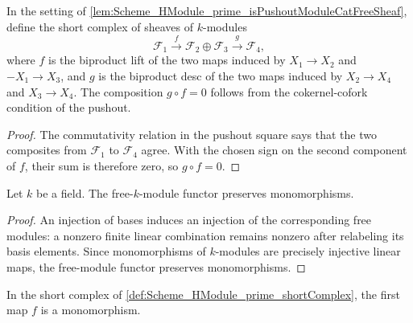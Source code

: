 \begin{definition}\leanok
  \label{def:Scheme_HModule_prime_shortComplex}

  In the setting of \cref{lem:Scheme_HModule_prime_isPushoutModuleCatFreeSheaf}, define the short complex of sheaves of \(k\)-modules
  \[
    \mathcal F_1 \xrightarrow{\;f\;} \mathcal F_2 \oplus \mathcal F_3 \xrightarrow{\;g\;} \mathcal F_4,
  \]
  where \(f\) is the biproduct lift of the two maps induced by \(X_1 \to X_2\) and \(-X_1 \to X_3\), and \(g\) is the biproduct desc of the two maps induced by \(X_2 \to X_4\) and \(X_3 \to X_4\). The composition \(g \circ f = 0\) follows from the cokernel-cofork condition of the pushout.
\end{definition}

\begin{proof}
  
  \leanok
  The commutativity relation in the pushout square says that the two composites from \(\mathcal F_1\) to \(\mathcal F_4\) agree. With the chosen sign on the second component of \(f\), their sum is therefore zero, so \(g\circ f=0\).
\end{proof}

\begin{definition}\leanok
  \label{def:Scheme_ModuleCat_free_preservesMonomorphisms}
  Let \(k\) be a field. The free-\(k\)-module functor preserves monomorphisms.
\end{definition}

\begin{proof}
  \leanok
  An injection of bases induces an injection of the corresponding free modules: a nonzero finite linear combination remains nonzero after relabeling its basis elements. Since monomorphisms of \(k\)-modules are precisely injective linear maps, the free-module functor preserves monomorphisms.
\end{proof}

\begin{lemma}\leanok
  \label{lem:Scheme_HModule_prime_shortComplex_f_mono}

  In the short complex of \cref{def:Scheme_HModule_prime_shortComplex}, the first map \(f\) is a monomorphism.
\end{lemma}

